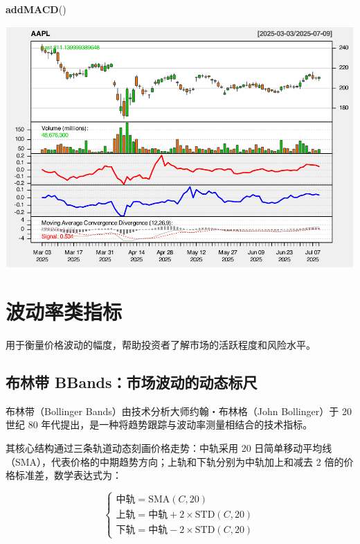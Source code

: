 \documentclass[]{ctexbook}
\newenvironment{Shaded}{\begin{snugshade}}{\end{snugshade}}
\newcommand{\FunctionTok}[1]{\textcolor[rgb]{0.13,0.29,0.53}{\textbf{#1}}}
\newcommand{\NormalTok}[1]{#1}
\begin{document}
\begin{Shaded}
\begin{Highlighting}[]
\FunctionTok{addMACD}\NormalTok{()}
\end{Highlighting}
\end{Shaded}

\includegraphics[width=0.9\linewidth]{quantmod_files/figure-latex/roc_2-4}

\section{波动率类指标}\label{ux6ce2ux52a8ux7387ux7c7bux6307ux6807}

用于衡量价格波动的幅度，帮助投资者了解市场的活跃程度和风险水平。

\subsection{布林带 BBands：市场波动的动态标尺}\label{ux5e03ux6797ux5e26-bbandsux5e02ux573aux6ce2ux52a8ux7684ux52a8ux6001ux6807ux5c3a}

布林带（Bollinger Bands）由技术分析大师约翰・布林格（John Bollinger）于 20 世纪 80 年代提出，是一种将趋势跟踪与波动率测量相结合的技术指标。

其核心结构通过三条轨道动态刻画价格走势：中轨采用 20 日简单移动平均线（SMA），代表价格的中期趋势方向；上轨和下轨分别为中轨加上和减去 2 倍的价格标准差，数学表达式为：

\[
\begin{cases}
\text{中轨} = \text{SMA}(C, 20) \\
\text{上轨} = \text{中轨} + 2 \times \text{STD}(C, 20) \\
\text{下轨} = \text{中轨} - 2 \times \text{STD}(C, 20)
\end{cases}
\]
\end{document}
